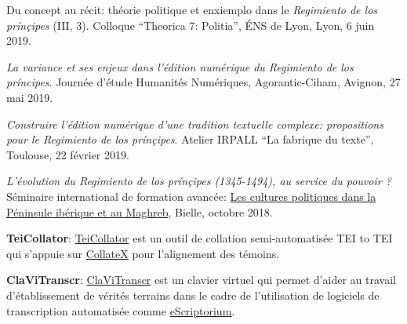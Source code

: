 \begin{rubric}{}
                    \entry*
                
                        Du concept au récit: théorie politique et
                                enxiemplo dans le \textit{Regimiento de los prínçipes} (III,
                            3). Colloque \enquote{Theorica 7: Politia}, ÉNS de Lyon, Lyon, 6
                        juin 2019. 
                    
                    \entry*
                \textit{La variance et ses enjeux dans l'édition numérique du \textit{Regimiento
                                de los príncipes}}. Journée d'étude Humanités Numériques,
                        Agorantic-Ciham, Avignon, 27 mai 2019.
                    
                    \entry*
                \textit{Construire l'édition numérique d'une tradition textuelle complexe:
                            propositions pour le \textit{Regimiento de los prínçipes}}. Atelier
                        IRPALL \enquote{La fabrique du texte}, Toulouse, 22 février
                        2019.
                    
                    \entry*
                \textit{L'évolution du \textit{Regimiento de los prínçipes} (1345-1494), au
                            service du pouvoir ?} Séminaire international de formation avancée:
                            \href{https://recherche.univ-pau.fr/fr/accueil/cpim.html}{Les cultures
                            politiques dans la Péninsule ibérique et au Maghreb},
                            Bielle, octobre 2018. 
            \vspace{1cm}
            
                    
                    \entry*
                \textbf{TeiCollator}: \href{https://github.com/matgille/tei-collator}{TeiCollator}
                        est un outil de collation semi-automatisée TEI to TEI qui s'appuie sur \href{https://pypi.org/project/collatex/}{CollateX} pour l'alignement
                        des témoins.
                    
                    \entry*
                \textbf{ClaViTranscr}: \href{https://github.com/matgille/transcription_virtual_keyboard}{ClaViTranscr} est un clavier virtuel qui permet d'aider au travail
                        d'établissement de vérités terrains dans le cadre de l'utilisation de logiciels
                        de transcription automatisée comme \href{https://gitlab.inria.fr/scripta/escriptorium}{eScriptorium}.
\end{rubric}


